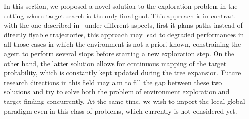 In this section, we proposed a novel solution to the exploration problem in the setting where target search is the only final goal.
This approach is in contrast with the one described in~ under different aspects, first it plans paths
instead of directly flyable trajectories, this approach may lead to degraded performances in all those cases in which the environment
is not a priori known, constraining the agent to perform several stops before starting a new exploration step. On the other hand, the latter
solution allows for continuous mapping of the target probability, which is constantly kept updated during the tree expansion.
Future research directions in this field may aim to fill the gap between these two solutions and try to solve both the problem of
environment exploration and target finding concurrently. At the same time, we wish to import the local-global paradigm even in this
class of problems, which currently is not considered yet.
